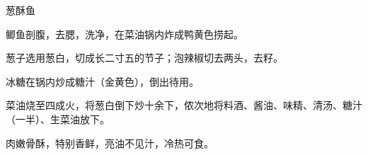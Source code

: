 \begin{recipe}{葱酥鱼}

\ingredients


\preparation

\step 鲫鱼剖腹，去腮，洗净，在菜油锅内炸成鸭黄色捞起。

\step 葱子选用葱白，切成长二寸五的节子；泡辣椒切去两头，去籽。

\step 冰糖在锅内炒成糖汁（金黄色），倒出待用。

\step 菜油烧至四成火，将葱白倒下炒十余下，侬次地将料酒、酱油、味精、清汤、糖汁
（一半）、生菜油放下。

\features

肉嫩骨酥，特别香鲜，亮油不见汁，冷热可食。

\end{recipe}

